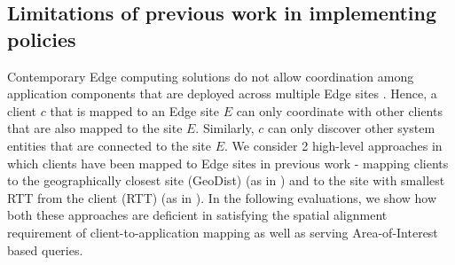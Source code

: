 \subsection{Limitations of previous work in implementing policies}
Contemporary Edge computing solutions do not allow coordination among application components that are deployed across multiple Edge sites \cite{gabriel, azure_iot_edge}. Hence, a client $c$ that is mapped to an Edge site $E$ can only coordinate with other clients that are also mapped to the site $E$. Similarly, $c$ can only discover other system entities that are connected to the site $E$. We consider 2 high-level approaches in which clients have been mapped to Edge sites in previous work - mapping clients to the geographically closest site (GeoDist) (as in \cite{lahderanta2021edge}) and to the site with smallest RTT from the client (RTT) (as in \cite{foglets}). In the following evaluations, we show how both these approaches are deficient in satisfying the spatial alignment requirement of client-to-application mapping as well as serving Area-of-Interest based queries.

